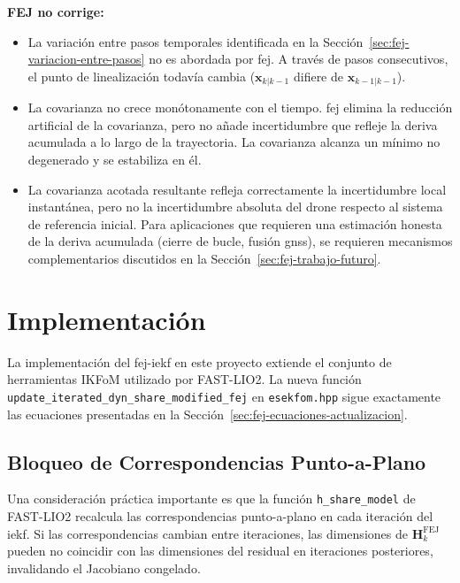 \textbf{FEJ no corrige:}

\begin{itemize}
    \item La variación entre pasos temporales identificada en la
    Sección~\ref{sec:fej-variacion-entre-pasos} no es abordada por \gls{fej}.
    A través de pasos consecutivos, el punto de linealización todavía cambia
    ($\mathbf{x}_{k|k-1}$ difiere de $\mathbf{x}_{k-1|k-1}$).
    \item La covarianza no crece monótonamente con el tiempo. \gls{fej}
    elimina la reducción artificial de la covarianza, pero no añade
    incertidumbre que refleje la deriva acumulada a lo largo de la
    trayectoria. La covarianza alcanza un mínimo no degenerado y se estabiliza
    en él.
    \item La covarianza acotada resultante refleja correctamente la
    incertidumbre local instantánea, pero no la incertidumbre absoluta del
    drone respecto al sistema de referencia inicial. Para aplicaciones que
    requieren una estimación honesta de la deriva acumulada (cierre de bucle,
    fusión \gls{gnss}), se requieren mecanismos complementarios discutidos en
    la Sección~\ref{sec:fej-trabajo-futuro}.
\end{itemize}

\section{Implementación}
\label{sec:fej-implementacion}

La implementación del \gls{fej}-\gls{iekf} en este proyecto extiende el conjunto
de herramientas IKFoM utilizado por FAST-LIO2. La nueva función
\texttt{update\_iterated\_dyn\_share\_modified\_fej} en
\texttt{esekfom.hpp} sigue exactamente las ecuaciones presentadas en la
Sección~\ref{sec:fej-ecuaciones-actualizacion}.

\subsection{Bloqueo de Correspondencias Punto-a-Plano}
\label{sec:fej-bloqueo-puntos}

Una consideración práctica importante es que la función \texttt{h\_share\_model}
de FAST-LIO2 recalcula las correspondencias punto-a-plano en cada iteración del
\gls{iekf}. Si las correspondencias cambian entre iteraciones, las dimensiones
de $\mathbf{H}_k^{\text{FEJ}}$ pueden no coincidir con las dimensiones del
residual en iteraciones posteriores, invalidando el Jacobiano congelado.


